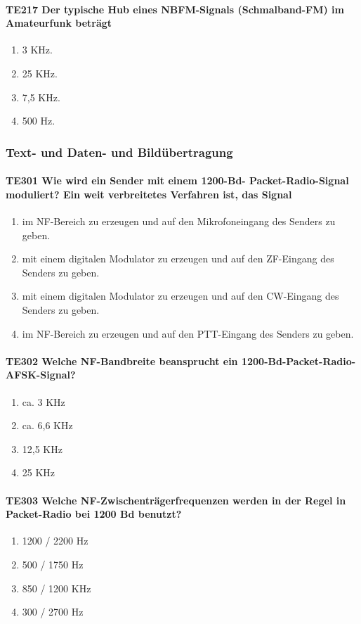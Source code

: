 \documentclass[8pt]{article}
\begin{document}
\begin{enumerate}
\begin{enumerate}[nolistsep,label=\Alph*]
\paragraph*{TE217 Der typische Hub eines NBFM-Signals (Schmalband-FM) im Amateurfunk beträgt} 
\begin{enumerate}[nolistsep,label=\Alph*]
\item 3 KHz.
\item 25 KHz.
\item 7,5 KHz.
\item 500 Hz.
\end{enumerate}

\pagebreak
\subsubsection{Text- und Daten- und Bildübertragung}
\paragraph*{TE301 Wie wird ein Sender mit einem 1200-Bd- Packet-Radio-Signal moduliert? Ein weit verbreitetes Verfahren ist, das Signal} 
\begin{enumerate}[nolistsep,label=\Alph*]
\item im NF-Bereich zu erzeugen und auf den Mikrofoneingang des Senders zu geben.
\item mit einem digitalen Modulator zu erzeugen und auf den ZF-Eingang des Senders zu geben.
\item mit einem digitalen Modulator zu erzeugen und auf den CW-Eingang des Senders zu geben.
\item im NF-Bereich zu erzeugen und auf den PTT-Eingang des Senders zu geben.
\end{enumerate}

\paragraph*{TE302 Welche NF-Bandbreite beansprucht ein 1200-Bd-Packet-Radio-AFSK-Signal?}
\begin{enumerate}[nolistsep,label=\Alph*]
\item ca. 3 KHz
\item ca. 6,6 KHz
\item 12,5 KHz
\item 25 KHz
\end{enumerate}

\paragraph*{TE303 Welche NF-Zwischenträgerfrequenzen werden in der Regel in Packet-Radio bei 1200 Bd benutzt?}
\begin{enumerate}[nolistsep,label=\Alph*]
\item 1200 / 2200 Hz
\item 500 / 1750 Hz
\item 850 / 1200 KHz
\item 300 / 2700 Hz
\end{enumerate}


\end{enumerate}
\end{enumerate}
\end{document}
